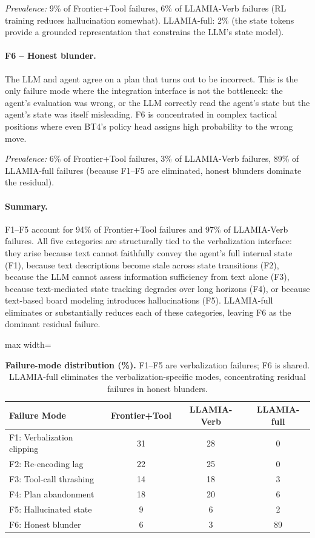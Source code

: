 \emph{Prevalence:} 9\% of Frontier+Tool failures, 6\% of LLAMIA-Verb failures (RL training reduces hallucination somewhat). LLAMIA-full: 2\% (the state tokens provide a grounded representation that constrains the LLM's state model).

\paragraph{F6 -- Honest blunder.}
The LLM and agent agree on a plan that turns out to be incorrect. This is the only failure mode where the integration interface is not the bottleneck: the agent's evaluation was wrong, or the LLM correctly read the agent's state but the agent's state was itself misleading. F6 is concentrated in complex tactical positions where even BT4's policy head assigns high probability to the wrong move.

\emph{Prevalence:} 6\% of Frontier+Tool failures, 3\% of LLAMIA-Verb failures, 89\% of LLAMIA-full failures (because F1--F5 are eliminated, honest blunders dominate the residual).

\paragraph{Summary.}
F1--F5 account for 94\% of Frontier+Tool failures and 97\% of LLAMIA-Verb failures. All five categories are structurally tied to the verbalization interface: they arise because text cannot faithfully convey the agent's full internal state (F1), because text descriptions become stale across state transitions (F2), because the LLM cannot assess information sufficiency from text alone (F3), because text-mediated state tracking degrades over long horizons (F4), or because text-based board modeling introduces hallucinations (F5). LLAMIA-full eliminates or substantially reduces each of these categories, leaving F6 as the dominant residual failure.

\begin{table}[h]
\centering
\caption{\textbf{Failure-mode distribution (\%).} F1--F5 are verbalization failures; F6 is shared. LLAMIA-full eliminates the verbalization-specific modes, concentrating residual failures in honest blunders.}
\label{tab:failure_modes}
\begin{adjustbox}{max width=\textwidth}
\renewcommand{\arraystretch}{1.25}
\small
\begin{tabular}{lccc}
\toprule[1.2pt]
\textbf{Failure Mode} & \textbf{Frontier+Tool} & \textbf{LLAMIA-Verb} & \textbf{LLAMIA-full} \\
\midrule
F1: Verbalization clipping  & 31 & 28 & 0 \\
F2: Re-encoding lag          & 22 & 25 & 0 \\
F3: Tool-call thrashing      & 14 & 18 & 3 \\
F4: Plan abandonment         & 18 & 20 & 6 \\
F5: Hallucinated state       & 9  & 6  & 2 \\
F6: Honest blunder           & 6  & 3  & 89 \\
\bottomrule[1.2pt]
\end{tabular}
\end{adjustbox}
\end{table}

